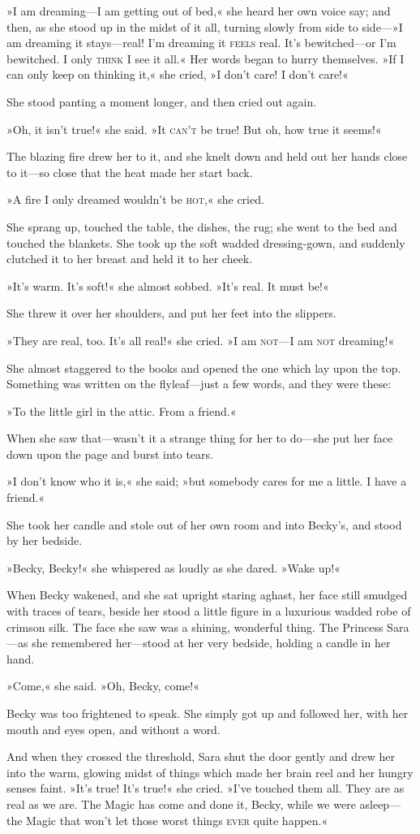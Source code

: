 »I am dreaming—I am getting out of bed,« she heard her own voice say; and then, as she stood up in the midst of it all, turning slowly from side to side—»I am dreaming it stays—real! I'm dreaming it \textsc{feels} real. It's bewitched—or I'm bewitched. I only \textsc{think} I see it all.« Her words began to hurry themselves. »If I can only keep on thinking it,« she cried, »I don't care! I don't care!«

She stood panting a moment longer, and then cried out again.

»Oh, it isn't true!« she said. »It \textsc{can't} be true! But oh, how true it seems!«

The blazing fire drew her to it, and she knelt down and held out her hands close to it—so close that the heat made her start back.

»A fire I only dreamed wouldn't be \textsc{hot},« she cried.

She sprang up, touched the table, the dishes, the rug; she went to the bed and touched the blankets. She took up the soft wadded dressing-gown, and suddenly clutched it to her breast and held it to her cheek.

»It's warm. It's soft!« she almost sobbed. »It's real. It must be!«

She threw it over her shoulders, and put her feet into the slippers.

»They are real, too. It's all real!« she cried. »I am \textsc{not}—I am \textsc{not} dreaming!«

She almost staggered to the books and opened the one which lay upon the top. Something was written on the flyleaf—just a few words, and they were these:

»To the little girl in the attic. From a friend.«

When she saw that—wasn't it a strange thing for her to do—she put her face down upon the page and burst into tears.

»I don't know who it is,« she said; »but somebody cares for me a little. I have a friend.«

She took her candle and stole out of her own room and into Becky's, and stood by her bedside.

»Becky, Becky!« she whispered as loudly as she dared. »Wake up!«

When Becky wakened, and she sat upright staring aghast, her face still smudged with traces of tears, beside her stood a little figure in a luxurious wadded robe of crimson silk. The face she saw was a shining, wonderful thing. The Princess Sara—as she remembered her—stood at her very bedside, holding a candle in her hand.

»Come,« she said. »Oh, Becky, come!«

Becky was too frightened to speak. She simply got up and followed her, with her mouth and eyes open, and without a word.

And when they crossed the threshold, Sara shut the door gently and drew her into the warm, glowing midst of things which made her brain reel and her hungry senses faint. »It's true! It's true!« she cried. »I've touched them all. They are as real as we are. The Magic has come and done it, Becky, while we were asleep—the Magic that won't let those worst things \textsc{ever} quite happen.«
